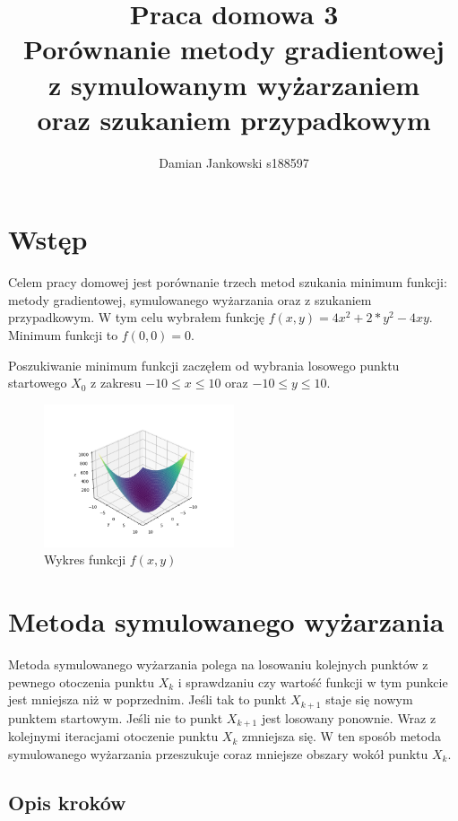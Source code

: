 \documentclass{article}
\title{Praca domowa 3\\Porównanie metody gradientowej\\ z symulowanym wyżarzaniem\\
oraz szukaniem przypadkowym}
\author{Damian Jankowski s188597}
\begin{document}
\maketitle

\section{Wstęp}
Celem pracy domowej jest porównanie trzech metod szukania minimum
funkcji: metody gradientowej, symulowanego wyżarzania oraz z szukaniem przypadkowym. 
W tym celu wybrałem funkcję
$f(x, y) = 4x^2+2*y^2-4xy$. Minimum funkcji to $f(0, 0) = 0$.

Poszukiwanie minimum funkcji
zaczęłem od wybrania losowego punktu startowego $X_0$ z zakresu
$-10 \le x \le 10$ oraz $-10 \le y \le 10$.

\begin{figure}[H]
    \centering
    \includegraphics[width=0.5\textwidth]{function.png}
    \caption{Wykres funkcji $f(x, y)$}
\end{figure}

\section{Metoda symulowanego wyżarzania}
Metoda symulowanego wyżarzania polega na losowaniu kolejnych punktów
z pewnego otoczenia punktu $X_k$ i sprawdzaniu czy wartość funkcji
w tym punkcie jest mniejsza niż w poprzednim. Jeśli tak to punkt
$X_{k+1}$ staje się nowym punktem startowym. Jeśli nie to punkt
$X_{k+1}$ jest losowany ponownie. Wraz z kolejnymi iteracjami
otoczenie punktu $X_k$ zmniejsza się. W ten sposób metoda
symulowanego wyżarzania przeszukuje coraz mniejsze obszary
wokół punktu $X_k$.

\subsection{Opis kroków}
\end{document}
